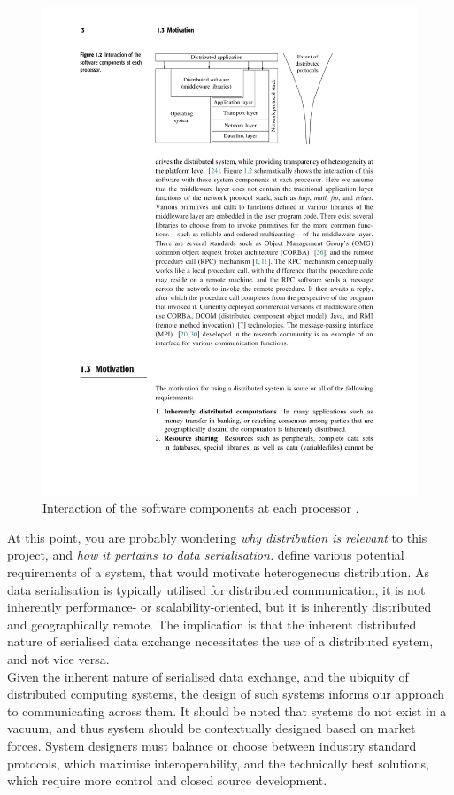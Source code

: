 \documentclass[../report.tex]{subfiles}
\begin{document}
\begin{figure}[H]
\centering
\includegraphics[width=0.8\linewidth]{figures/processinteraction.pdf}
\caption{Interaction of the software components at each processor \cite[p. 3]{kshemkalyani2011distributed}.}
\label{fig:processinteraction}
\end{figure}

At this point, you are probably wondering \textit{why distribution is relevant} to this project, and \textit{how it pertains to data serialisation.} \cite{kshemkalyani2011distributed} define various potential requirements of a system, that would motivate heterogeneous distribution. As data serialisation is typically utilised for distributed communication, it is not inherently performance- or scalability-oriented, but it is inherently distributed and geographically remote. The implication is that the inherent distributed nature of serialised data exchange necessitates the use of a distributed system, and not vice versa. \\

Given the inherent nature of serialised data exchange, and the ubiquity of distributed computing systems, the design of such systems informs our approach to communicating across them. It should be noted that systems do not exist in a vacuum, and thus system should be contextually designed based on market forces. System designers must balance or choose between industry standard protocols, which maximise interoperability, and the technically best solutions, which require more control and closed source development.
\end{document}
